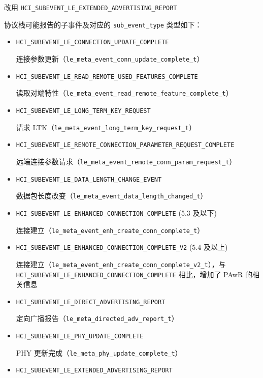 \documentclass[
  12pt,
]{book}
\begin{document}
\begin{enumerate}
\begin{itemize}
    改用 \texttt{HCI\_SUBEVENT\_LE\_EXTENDED\_ADVERTISING\_REPORT}
  \end{itemize}

  协议栈可能报告的子事件及对应的 \texttt{sub\_event\_type} 类型如下：

  \begin{itemize}
  \item
    \texttt{HCI\_SUBEVENT\_LE\_CONNECTION\_UPDATE\_COMPLETE}

    连接参数更新（\texttt{le\_meta\_event\_conn\_update\_complete\_t}）
  \item
    \texttt{HCI\_SUBEVENT\_LE\_READ\_REMOTE\_USED\_FEATURES\_COMPLETE}

    读取对端特性（\texttt{le\_meta\_event\_read\_remote\_feature\_complete\_t}）
  \item
    \texttt{HCI\_SUBEVENT\_LE\_LONG\_TERM\_KEY\_REQUEST}

    请求 LTK（\texttt{le\_meta\_event\_long\_term\_key\_request\_t}）
  \item
    \texttt{HCI\_SUBEVENT\_LE\_REMOTE\_CONNECTION\_PARAMETER\_REQUEST\_COMPLETE}

    远端连接参数请求（\texttt{le\_meta\_event\_remote\_conn\_param\_request\_t}）
  \item
    \texttt{HCI\_SUBEVENT\_LE\_DATA\_LENGTH\_CHANGE\_EVENT}

    数据包长度改变（\texttt{le\_meta\_event\_data\_length\_changed\_t}）
  \item
    \texttt{HCI\_SUBEVENT\_LE\_ENHANCED\_CONNECTION\_COMPLETE} (5.3 及以下)

    连接建立（\texttt{le\_meta\_event\_enh\_create\_conn\_complete\_t}）
  \item
    \texttt{HCI\_SUBEVENT\_LE\_ENHANCED\_CONNECTION\_COMPLETE\_V2} (5.4 及以上)

    连接建立（\texttt{le\_meta\_event\_enh\_create\_conn\_complete\_v2\_t}），与
    \texttt{HCI\_SUBEVENT\_LE\_ENHANCED\_CONNECTION\_COMPLETE} 相比，增加了 PAwR 的相关信息
  \item
    \texttt{HCI\_SUBEVENT\_LE\_DIRECT\_ADVERTISING\_REPORT}

    定向广播报告（\texttt{le\_meta\_directed\_adv\_report\_t}）
  \item
    \texttt{HCI\_SUBEVENT\_LE\_PHY\_UPDATE\_COMPLETE}

    PHY 更新完成（\texttt{le\_meta\_phy\_update\_complete\_t}）
  \item
    \texttt{HCI\_SUBEVENT\_LE\_EXTENDED\_ADVERTISING\_REPORT}


\end{itemize}
\end{enumerate}
\end{document}
